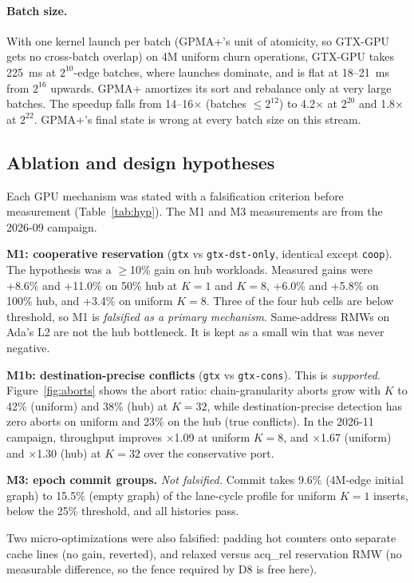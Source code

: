 \documentclass[sigconf,nonacm]{acmart}
\newcommand{\sys}{GTX-GPU}
\newcommand{\code}[1]{\texttt{#1}}
\begin{document}
\paragraph{Batch size.} With one kernel launch per batch (GPMA+'s unit of atomicity, so \sys{} gets no cross-batch
overlap) on 4M uniform churn operations, \sys{} takes 225~ms at $2^{10}$-edge batches, where launches dominate, and is
flat at 18--21~ms from $2^{16}$ upwards. GPMA+ amortizes its sort and rebalance only at very large batches. The speedup
falls from 14--16$\times$ (batches $\le 2^{12}$) to 4.2$\times$ at $2^{20}$ and 1.8$\times$ at $2^{22}$. GPMA+'s final
state is wrong at every batch size on this stream.

\subsection{Ablation and design hypotheses}
\label{sec:ablation}
Each GPU mechanism was stated with a falsification criterion before measurement (Table~\ref{tab:hyp}). The M1 and M3
measurements are from the 2026-09 campaign.

\textbf{M1: cooperative reservation} (\code{gtx} vs \code{gtx-dst-only}, identical except \code{coop}). The
hypothesis was a $\ge$10\% gain on hub workloads. Measured gains were +8.6\% and +11.0\% on 50\% hub at $K{=}1$ and
$K{=}8$, +6.0\% and +5.8\% on 100\% hub, and +3.4\% on uniform $K{=}8$. Three of the four hub cells are below
threshold, so M1 is \emph{falsified as a primary mechanism}. Same-address RMWs on Ada's L2 are not the hub bottleneck.
It is kept as a small win that was never negative.

\textbf{M1b: destination-precise conflicts} (\code{gtx} vs \code{gtx-cons}). This is \emph{supported}.
Figure~\ref{fig:aborts} shows the abort ratio: chain-granularity aborts grow with $K$ to 42\% (uniform) and 38\% (hub)
at $K{=}32$, while destination-precise detection has zero aborts on uniform and 23\% on the hub (true conflicts).
In the 2026-11 campaign, throughput improves $\times$1.09 at uniform $K{=}8$, and $\times$1.67 (uniform) and
$\times$1.30 (hub) at $K{=}32$ over the conservative port.

\textbf{M3: epoch commit groups.} \emph{Not falsified.} Commit takes 9.6\% (4M-edge initial graph) to 15.5\% (empty
graph) of the lane-cycle profile for uniform $K{=}1$ inserts, below the 25\% threshold, and all histories pass.

Two micro-optimizations were also falsified: padding hot counters onto separate cache lines (no gain, reverted), and
relaxed versus acq\_rel reservation RMW (no measurable difference, so the fence required by D8 is free here).
\end{document}
